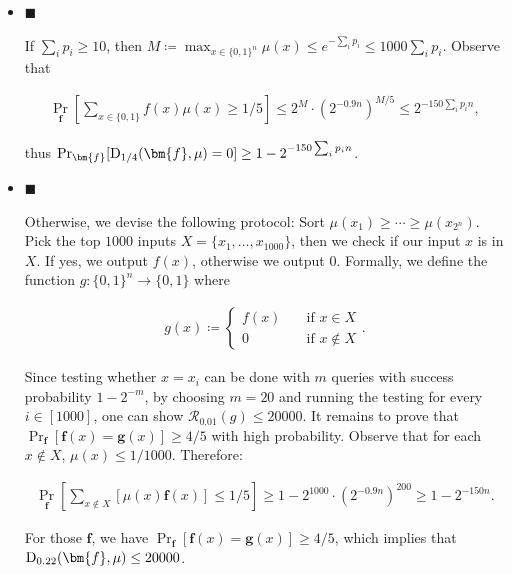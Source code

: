 \documentclass[10pt,a4paper]{article}
\begin{document}
\begin{itemize}


\item[] 
$\blacksquare$ 


If $\sum_{i}p_{i}\geq 10$, then $M\coloneqq\max_{x\in\{0,1\}^{n}}\mu(x)\leq e^{-\sum_{i}p_{i}}\leq 1000\sum_{i}p_{i}$. Observe that\par


\[\begin{gathered}
\Pr_{\bm{f}}\left[\sum\nolimits_{x\in\{0,1\}}f(x)\mu(x)\geq 1/5\right]\leq 2^{M}\cdot(2^{-0.9n})^{M/5}\leq 2^{-150\sum_{i}p_{i}n},
\end{gathered}\]


thus $\Pr_{\bm{f}}[{\textup{D}}_{1/4}(\bm{f},\mu)=0]\geq 1-2^{-150\sum_{i}p_{i}n}$.\par





\item[] 
$\blacksquare$ 


Otherwise, we devise the following protocol:
Sort $\mu(x_{1})\geq\cdots\geq\mu(x_{2^{n}})$.
Pick the top $1000$ inputs $X=\{x_{1},\ldots,x_{1000}\}$,
then we check if our input $x$ is in $X$.
If yes, we output $f(x)$, otherwise we output $0$.
Formally, we define the function $g:\{0,1\}^{n}\to\{0,1\}$ where\par


\[\begin{gathered}
g(x)\coloneqq\begin{cases}f(x)&\quad\text{if $x\in X$}\\
0&\quad\text{if $x\notin X$}\end{cases}.
\end{gathered}\]


Since testing whether $x=x_{i}$ can be done with $m$ queries with success probability $1-2^{-m}$, by choosing $m=20$ and running the testing for every $i\in[1000]$, one can show $\mathcal{R}_{0.01}(g)\leq 20000$. It remains to prove that $\Pr_{\bm{f}}[\bm{f}(x)=\bm{g}(x)]\geq 4/5$ with high probability. Observe that for each $x\notin X$, $\mu(x)\leq 1/1000$. Therefore:\par


\[\begin{gathered}
\Pr_{\bm{f}}\left[\sum\nolimits_{x\notin X}[\mu(x)\bm{f}(x)]\leq 1/5\right]\geq 1-2^{1000}\cdot(2^{-0.9n})^{200}\geq 1-2^{-150n}.
\end{gathered}\]


For those $\bm{f}$, we have $\Pr_{\bm{f}}[\bm{f}(x)=\bm{g}(x)]\geq 4/5$, which implies that ${\textup{D}}_{0.22}(\bm{f},\mu)\leq 20000$.\par





\end{itemize}
\end{document}
